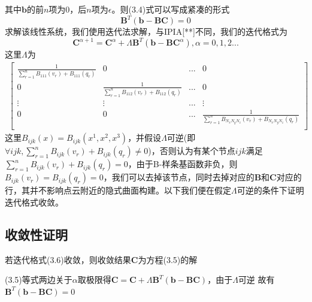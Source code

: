 其中$\mathbf{b}$的前$n$项为$0$，后$n$项为$\epsilon$。则(3.4)式可以写成紧凑的形式
\begin{equation}
    \mathbf{B}^T ( \mathbf{b} - \mathbf{B} \mathbf{C}) = 0    
\end{equation}
求解该线性系统，我们使用迭代法求解，与IPIA[**]不同，我们的迭代格式为
\begin{equation}
\mathbf{C}^{\alpha + 1} = \mathbf{C}^{\alpha} + \Lambda \mathbf{B}^T(\mathbf{b} - \mathbf{B}\mathbf{C}^{\alpha}) , \alpha = 0,1,2...
\end{equation}
这里$\Lambda$为
\begin{equation}
    \begin{split}
        \begin{bmatrix}
            \frac{1}{\sum_{r = 1}^n B_{111}(v_r) +B_{111}(q_r)} & 0 & ... & 0\\
            0 & \frac{1}{\sum_{r = 1}^n B_{112}(v_r) +B_{112}(q_r)} & ... & 0\\
            \vdots & \vdots & ... & \vdots \\
            0 & 0 & ... & \frac{1}{\sum_{r = 1}^n B_{N_xN_yN_z}(v_r) +B_{N_xN_yN_z}(q_r)} \\
        \end{bmatrix}
    \end{split}
\end{equation}
这里$B_{ijk}(x) = B_{ijk}(x^1,x^2,x^3)$，并假设$\Lambda$可逆(即$\forall ijk ,\sum_{r = 1}^n B_{ijk}(v_r) +B_{ijk}(q_r) \neq 0$)，否则认为有某个节点$ijk$满足$\sum_{r = 1}^n B_{ijk}(v_r) +B_{ijk}(q_r) = 0$，由于B-样条基函数非负，则$B_{ijk}(v_r) = B_{ijk}(q_r) = 0$，我们可以去掉该节点，同时去掉对应的$\mathbf{B}$和$\mathbf{C}$对应的行，其并不影响点云附近的隐式曲面构建。以下我们便在假定$\Lambda$可逆的条件下证明迭代格式收敛。
\subsection{收敛性证明}
\begin{thm}
    若迭代格式(3.6)收敛，则收敛结果$\mathbf{C}$为方程(3.5)的解
\end{thm}
\begin{pro}
    (3.5)等式两边关于$\alpha$取极限得$\mathbf{C} = \mathbf{C} + \Lambda \mathbf{B}^T(\mathbf{b} - \mathbf{B}\mathbf{C})$，由于$\Lambda$可逆
    故有$\mathbf{B}^T(\mathbf{b} - \mathbf{B}\mathbf{C}) = 0$
\end{pro}

\begin{lem}
\end{lem}

